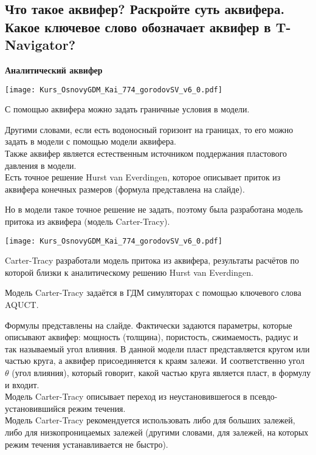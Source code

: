 

\subsection{Что такое аквифер? Раскройте суть аквифера. Какое ключевое слово обозначает аквифер в T-Navigator?}

\textbf{Аналитический аквифер}

\texttt{[image: Kurs\_OsnovyGDM\_Kai\_774\_gorodovSV\_v6\_0.pdf]}

С помощью аквифера можно задать граничные условия в модели.

Другими словами, если есть водоносный горизонт на границах, то его можно задать в модели с помощью модели аквифера.
\\

Также аквифер является естественным источником поддержания пластового давления в модели.
\\

Есть точное решение Hurst van Everdingen, которое описывает приток из аквифера конечных размеров (формула представлена на слайде).

Но в модели такое точное решение не задать, поэтому была разработана модель притока из аквифера (модель Carter-Tracy).

\texttt{[image: Kurs\_OsnovyGDM\_Kai\_774\_gorodovSV\_v6\_0.pdf]}

Carter-Tracy разработали модель притока из аквифера, результаты расчётов по которой близки к аналитическому решению Hurst van Everdingen.

Модель Carter-Tracy задаётся в ГДМ симуляторах с помощью ключевого слова AQUCT.

Формулы представлены на слайде.
Фактически задаются параметры, которые описывают аквифер: мощность (толщина), пористость, сжимаемость, радиус и так называемый угол влияния.
В данной модели пласт представляется кругом или частью круга, а аквифер присоединяется к краям залежи.
И соответственно угол $\theta$ (угол влияния), который говорит, какой частью круга является пласт, в формулу и входит.
\\

Модель Carter-Tracy описывает переход из неустановившегося в псевдо-установившийся режим течения. 
\\

Модель Carter-Tracy рекомендуется использовать либо для больших залежей, либо для низкопроницаемых залежей (другими словами, для залежей, на которых режим течения устанавливается не быстро).

